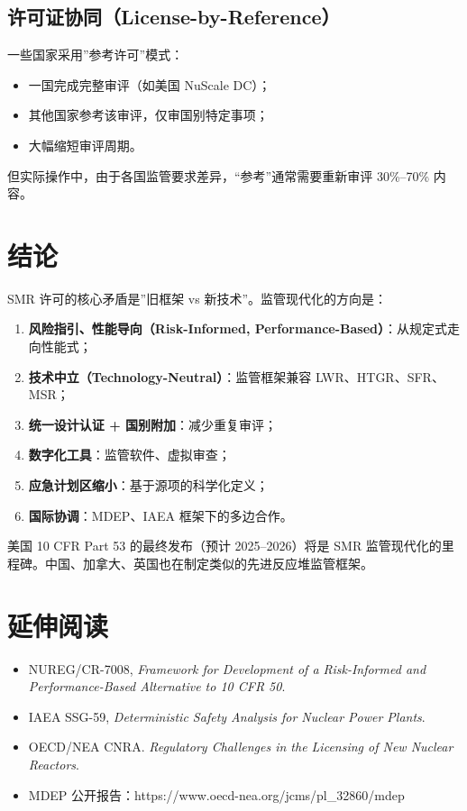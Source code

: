\documentclass[
  UTF8,
  scheme=plain,
  fontsize=10pt,
  openany
]{ctexbook}
\begin{document}
\subsection{许可证协同（License-by-Reference）}\label{ux8bb8ux53efux8bc1ux534fux540clicense-by-reference}

一些国家采用''参考许可''模式：

\begin{itemize}
\tightlist
\item
  一国完成完整审评（如美国 NuScale DC）；
\item
  其他国家参考该审评，仅审国别特定事项；
\item
  大幅缩短审评周期。
\end{itemize}

但实际操作中，由于各国监管要求差异，``参考''通常需要重新审评 30\%--70\%
内容。

\section{结论}\label{ux7ed3ux8bba-5}

SMR 许可的核心矛盾是''旧框架 vs 新技术''。监管现代化的方向是：

\begin{enumerate}
\def\labelenumi{\arabic{enumi}.}
\tightlist
\item
  \textbf{风险指引、性能导向（Risk-Informed,
  Performance-Based）}：从规定式走向性能式；
\item
  \textbf{技术中立（Technology-Neutral）}：监管框架兼容
  LWR、HTGR、SFR、MSR；
\item
  \textbf{统一设计认证 + 国别附加}：减少重复审评；
\item
  \textbf{数字化工具}：监管软件、虚拟审查；
\item
  \textbf{应急计划区缩小}：基于源项的科学化定义；
\item
  \textbf{国际协调}：MDEP、IAEA 框架下的多边合作。
\end{enumerate}

美国 10 CFR Part 53 的最终发布（预计 2025--2026）将是 SMR
监管现代化的里程碑。中国、加拿大、英国也在制定类似的先进反应堆监管框架。

\section{延伸阅读}\label{ux5ef6ux4f38ux9605ux8bfb}

\begin{itemize}
\tightlist
\item
  NUREG/CR-7008, \emph{Framework for Development of a Risk-Informed and
  Performance-Based Alternative to 10 CFR 50}.
\item
  IAEA SSG-59, \emph{Deterministic Safety Analysis for Nuclear Power
  Plants}.
\item
  OECD/NEA CNRA. \emph{Regulatory Challenges in the Licensing of New
  Nuclear Reactors}.
\item
  MDEP 公开报告：https://www.oecd-nea.org/jcms/pl\_32860/mdep
\end{itemize}
\end{document}
